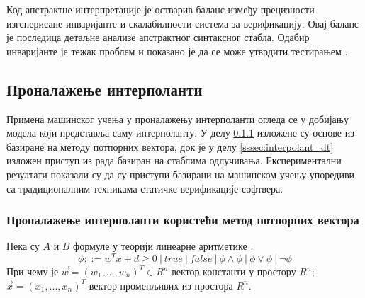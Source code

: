 \documentclass[a4paper]{article}
\begin{document}
{Код апстрактне интерпретације је остварив баланс између прецизности изгенерисане инваријанте и скалабилности система за верификацију. Овај баланс је последица детаљне анализе апстрактног синтаксног стабла. Одабир инваријанте је тежак проблем и показано је да се може утврдити тестирањем \cite{KrishnaPW15, Sharma_interpolantsas}.


\label{sec:primene}

\subsection{Проналажење интерполанти}
\label{ssec:interpolant}

Примена машинског учења у проналажењу интерполанти огледа се у добијању модела
који представља саму интерполанту. У делу \ref{sssec:interpolant_svm} изложене су основе из \cite{Sharma_interpolantsas} базиране на методу
потпорних вектора, док је у делу \ref{sssec:interpolant_dt} изложен приступ из рада \cite{KrishnaPW15} базиран на стаблима одлучивања. Експериментални резултати
показали су да су приступи базирани на машинском учењу упоредиви са традиционалним техникама статичке верификације софтвера.


\subsubsection{Проналажење интерполанти користећи метод потпорних вектора}
\label{sssec:interpolant_svm}

Нека су $A$ и $B$ формуле у теорији линеарне аритметике \cite{Kroening2008}.
\begin{equation}
\phi ::= w^Tx + d \geq 0 \ | \ true \ | \ false \ | \ \phi \land \phi \ | \ \phi \lor \phi \ | \ \neg \phi
\end{equation}
При чему је $\vec{w} = (w_1, ..., w_n)^T \in R^n$ вектор константи у простору $R^n$; $\vec{x} = (x_1, ..., x_n)^T$
вектор променљивих из простора $R^n$.

}
\end{document}
